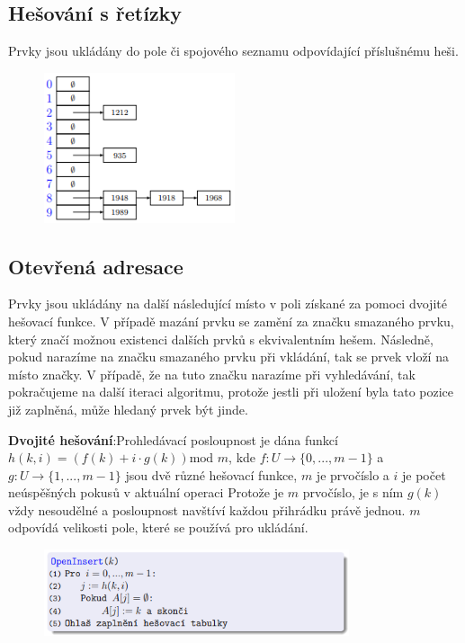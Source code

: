 \documentclass{szzclass}
\begin{document}
\subsection{Hešování s řetízky}
Prvky jsou ukládány do pole či spojového seznamu odpovídající příslušnému heši.

\begin{figure}[h!]
\centering
\includegraphics[width=0.5\textwidth]{topics/bi-spol-05/images/hashRetizky.png}
\end{figure}

\subsection{Otevřená adresace}
Prvky jsou ukládány na další následující místo v poli získané za pomoci dvojité hešovací funkce. V případě mazání prvku se zamění za
značku smazaného prvku, který značí možnou existenci dalších prvků s ekvivalentním hešem.
Následně, pokud narazíme na značku smazaného prvku při vkládání, tak se prvek vloží na místo značky.
V případě, že na tuto značku narazíme při vyhledávání, tak pokračujeme na další iteraci algoritmu, protože
jestli při uložení byla tato pozice již zaplněná, může hledaný prvek být jinde.

\textbf{Dvojité hešování}:\newline Prohledávací posloupnost je dána funkcí
$h(k, i) = (f(k) + i \cdot g(k)) \text{mod } m$, kde $f : U \rightarrow \{0, . . . , m - 1\}$ a
$g : U → \{1, . . . , m - 1\}$ jsou dvě různé hešovací funkce, $m$ je
prvočíslo a $i$ je počet neúspěšných pokusů v aktuální operaci
Protože je $m$ prvočíslo, je s ním $g(k)$ vždy nesoudělné a
posloupnost navštíví každou přihrádku právě jednou.
$m$ odpovídá velikosti pole, které se používá pro ukládání.

\begin{figure}[h!]
\centering
\includegraphics[width=0.8\textwidth]{topics/bi-spol-05/images/hashOpenInsert.png}
\end{figure}
\end{document}
